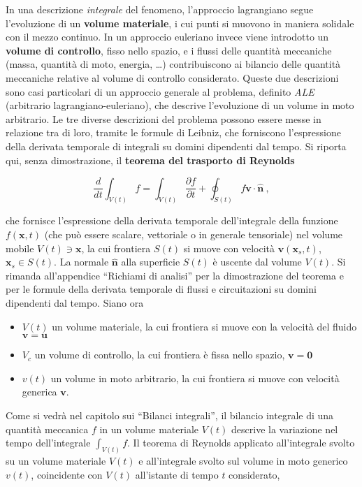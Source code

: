 In una descrizione \textit{integrale} del fenomeno, l'approccio lagrangiano segue l'evoluzione di un \textbf{volume materiale}, i cui punti si muovono in maniera solidale con il mezzo continuo. In un approccio euleriano invece viene introdotto un \textbf{volume di controllo}, fisso nello spazio, e i flussi delle quantità meccaniche  (massa, quantità di moto, energia, \dots) contribuiscono ai bilancio delle quantità meccaniche relative al volume di controllo considerato. Queste due descrizioni sono casi particolari di un approccio generale al problema, definito \textit{ALE} (arbitrario lagrangiano-euleriano), che descrive l'evoluzione di un volume in moto arbitrario.
\newline
Le tre diverse descrizioni del problema possono essere messe in relazione tra di loro, tramite le formule di Leibniz, che forniscono l'espressione della derivata temporale di integrali su domini dipendenti dal tempo. Si riporta qui, senza dimostrazione, il \textbf{teorema del trasporto di Reynolds}
\begin{fBox}
\begin{equation}
 \dfrac{d}{d t} \int_{V(t)} f = \int_{V(t)} \dfrac{\partial f}{\partial t} +
  \oint_{S(t)} f\bm{v} \cdot \bm{\hat{n}} \ , 
\end{equation}
\end{fBox}
 che fornisce l'espressione della derivata temporale dell'integrale della funzione $f(\bm{x},t)$ (che può essere scalare, vettoriale o in generale tensoriale) nel volume mobile $V(t) \ni \bm{x}$, la cui frontiera $S(t)$ si muove con velocità $\bm{v}(\bm{x}_s,t)$, $\bm{x}_s \in S(t)$. La normale $\bm{\hat{n}}$ alla superficie $S(t)$ è uscente dal volume $V(t)$. 
Si rimanda all'appendice ``Richiami di analisi'' per la dimostrazione del teorema e per le formule della derivata temporale di flussi e circuitazioni su domini dipendenti dal tempo.
\newline
Siano ora
\begin{itemize}
 \item $V(t)$ un volume materiale, la cui frontiera si muove con la velocità del fluido $\bm{v}=\bm{u}$
 \item $V_c$ un volume di controllo, la cui frontiera è fissa nello spazio, $\bm{v}=\bm{0}$
 \item $v(t)$ un volume in moto arbitrario, la cui frontiera si muove con velocità generica $\bm{v}$.
\end{itemize}
Come si vedrà nel capitolo sui ``Bilanci integrali'', il bilancio integrale di una quantità meccanica $f$ in un volume materiale $V(t)$ descrive la variazione nel tempo dell'integrale $\int_{V(t)} f$. Il teorema di Reynolds applicato all'integrale svolto su un volume materiale $V(t)$ e all'integrale svolto sul volume in moto generico $v(t)$, coincidente con $V(t)$ all'istante di tempo $t$ considerato,
